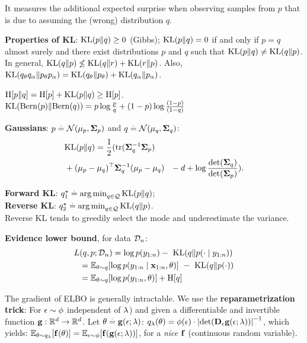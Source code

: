 It measures the additional expected surprise when observing samples from $p$ that is due to assuming the (wrong) distribution $q$.
\begin{framed}
    \textbf{Properties of KL}:
    $\KL{p}{q} \geq 0$ (Gibbs); $\KL{p}{q} = 0$ if and only if $p = q$ almost surely and there exist distributions $p$ and $q$ such that $\KL{p}{q} \neq \KL{q}{p}$. In general, \(\KL{q}{p}\not\leq \KL{q}{r}+\KL{r}{p}\). Also, \(\KL{q_\theta q_\alpha}{p_\theta p_\alpha}=\KL{q_\theta}{p_\theta}+\KL{q_\alpha}{p_\alpha}\).
\end{framed}
$\crH{p}{q} = \H{p} + \KL{p}{q} \geq \H{p}$.\\
$\KL{\Bern{p}}{\Bern{q}} = p \log \frac{p}{q} + (1-p) \log \frac{(1-p)}{(1-q)}$  \\
\begin{framed}
    \textbf{Gaussians}: ${p \defeq \N{\vmu_p}{\mSigma_p}}$ and ${q \defeq \N{\vmu_q}{\mSigma_q}}$: \\
    \begin{align*}
    &\KL{p}{q} = \frac{1}{2} (\mathrm{tr}(\inv{\mSigma_q} \mSigma_p) \\ &+ \transpose{(\vmu_p - \vmu_q)} \inv{\mSigma_q} (\vmu_p - \vmu_q) \phantom{\frac12}  - d + \log \frac{\det{\mSigma_q}}{\det{\mSigma_p}}).
    \end{align*}
\end{framed}
\textbf{Forward KL}: $\qs_1 \defeq \argmin_{q \in \spQ} \KL{p}{q}$;\\
\textbf{Reverse KL}: $\qs_2 \defeq \argmin_{q \in \spQ} \KL{q}{p}$.\\
Reverse KL tends to greedily select the mode and underestimate the variance.
\begin{framed}
    \textbf{Evidence lower bound}, for data $\mathcal{D}_n$:\\
    \begin{align*}
        L&(q, p; \spD_n) = \log p(y_{1:n}) -\ \KL{q}{p(\cdot \mid y_{1:n})} \\
        &= \E[\vtheta \sim q]{\log p(y_{1:n} \mid \vx_{1:n}, \vtheta)}\ -\ \KL{q}{p(\cdot)}\\
        &= \mathbb{E}_{\vtheta\sim q}[\log p(y_{1:n},\theta)]+\H{q}
    \end{align*}
\end{framed}
The gradient of ELBO is generally intractable. We use the \textbf{reparametrization trick}: For $\mathbf{\epsilon} \sim \phi$ independent of $\mathbf{\lambda}$) and given a differentiable and invertible function $\mathbf{g} : \mathbb{R}^d \to \mathbb{R}^d$. Let $\mathbf{\theta} \overset{.}{=} \mathbf{g}(\mathbf{\epsilon}; \mathbf{\lambda})$: $q_\vlambda(\vtheta) = \phi(\vepsilon) \cdot \inv{\abs{\det{\jac_\vepsilon \vg(\vepsilon; \vlambda)}}}$, which yields: $\E[\vtheta \sim q_\vlambda]{\vf(\vtheta)} = \E[\vepsilon \sim \phi]{\vf(\vg(\vepsilon; \vlambda))}$, for a \textit{nice} $\mathbf{f}$ (continuous random variable). \\
